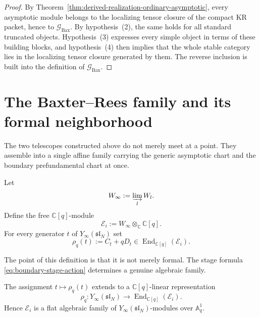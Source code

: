 \begin{proof}
By Theorem~\ref{thm:derived-realization-ordinary-asymptotic}, every
asymptotic module belongs to the localizing tensor closure of the compact
KR packet, hence to $\mathcal G_{\mathrm{Bax}}$.  By hypothesis~(2), the
same holds for all standard truncated objects.  Hypothesis~(3) expresses
every simple object in terms of these building blocks, and
hypothesis~(4) then implies that the whole stable category lies in the
localizing tensor closure generated by them.  The reverse inclusion is
built into the definition of $\mathcal G_{\mathrm{Bax}}$.
\end{proof}

\section{The Baxter--Rees family and its formal neighborhood}
\label{sec:typeA-baxter-rees-family}

The two telescopes constructed above do not merely meet at a point.  They
assemble into a single affine family carrying the generic asymptotic chart
and the boundary prefundamental chart at once.

\begin{definition}
\label{def:baxter-rees-family}
Let
\begin{equation}
W_\infty:=\varinjlim_l W_l.
\end{equation}
Define the free $\mathbb C[q]$-module
\begin{equation}
\mathcal E_i:=W_\infty\otimes_{\mathbb C}\mathbb C[q].
\end{equation}
For every generator $t$ of $Y_\infty(\mathfrak{sl}_N)$ set
\begin{equation}
\rho_q(t):=C_t+qD_t\in \operatorname{End}_{\mathbb C[q]}(\mathcal E_i).
\end{equation}
\end{definition}

The point of this definition is that it is not merely formal.  The stage
formula \eqref{eq:boundary-stage-action} determines a genuine algebraic
family.

\begin{theorem}
\ClaimStatusProvedHere
\label{thm:algebraicity-baxter-rees-family}
The assignment $t\mapsto \rho_q(t)$ extends to a
$\mathbb C[q]$-linear representation
\begin{equation}
\rho_q:Y_\infty(\mathfrak{sl}_N)
\longrightarrow
\operatorname{End}_{\mathbb C[q]}(\mathcal E_i).
\end{equation}
Hence $\mathcal E_i$ is a flat algebraic family of
$Y_\infty(\mathfrak{sl}_N)$-modules over $\mathbb A^1_q$.
\end{theorem}


